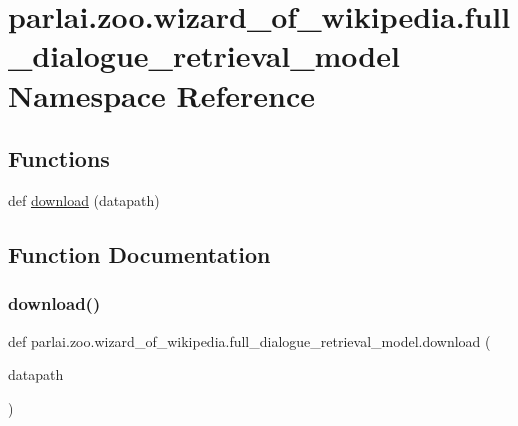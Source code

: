 \hypertarget{namespaceparlai_1_1zoo_1_1wizard__of__wikipedia_1_1full__dialogue__retrieval__model}{}\section{parlai.\+zoo.\+wizard\+\_\+of\+\_\+wikipedia.\+full\+\_\+dialogue\+\_\+retrieval\+\_\+model Namespace Reference}
\label{namespaceparlai_1_1zoo_1_1wizard__of__wikipedia_1_1full__dialogue__retrieval__model}
\subsection*{Functions}
\begin{DoxyCompactItemize}
\item 
def \hyperlink{namespaceparlai_1_1zoo_1_1wizard__of__wikipedia_1_1full__dialogue__retrieval__model_ac0657f65992bc0ee1be1b6f673ae50e6}{download} (datapath)
\end{DoxyCompactItemize}


\subsection{Function Documentation}
\mbox{\label{namespaceparlai_1_1zoo_1_1wizard__of__wikipedia_1_1full__dialogue__retrieval__model_ac0657f65992bc0ee1be1b6f673ae50e6}} 
\subsubsection{\texorpdfstring{download()}{download()}}
{\footnotesize\ttfamily def parlai.\+zoo.\+wizard\+\_\+of\+\_\+wikipedia.\+full\+\_\+dialogue\+\_\+retrieval\+\_\+model.\+download (\begin{DoxyParamCaption}\item[{}]{datapath }\end{DoxyParamCaption})}

